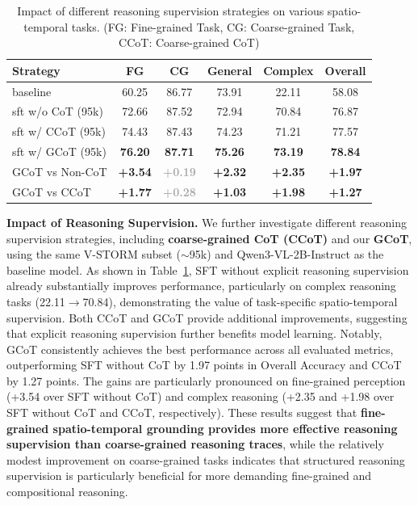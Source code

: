 \documentclass[letterpaper]{article} %
\begin{document}
\begin{table}[t]
\centering
\small
\caption{Impact of different reasoning supervision strategies on various spatio-temporal tasks. (FG: Fine-grained Task, CG: Coarse-grained Task, CCoT: Coarse-grained CoT)}
\setlength{\tabcolsep}{1mm}
\begin{tabular}{lccccc}
\toprule
\textbf{Strategy} 
& \textbf{FG} 
& \textbf{CG} 
& \textbf{General} 
& \textbf{Complex} 
& \textbf{Overall} \\
\midrule
baseline 
& 60.25 & 86.77 & 73.91 & 22.11 & 58.08 \\

sft w/o CoT (95k) 
& 72.66 & 87.52 & 72.94 & 70.84 & 76.87\\

sft w/ CCoT (95k) 
& 74.43 & 87.43 & 74.23 & 71.21 & 77.57 \\

sft w/ GCoT (95k) 
& \textbf{76.20} & \textbf{87.71} & \textbf{75.26} & \textbf{73.19} & \textbf{78.84} \\
\midrule

GCoT vs Non-CoT 
& \textbf{\textcolor{green!70!black}{+3.54}}
& \textbf{\textcolor{darkgray}{+0.19}}
& \textbf{\textcolor{green!70!black}{+2.32}}
& \textbf{\textcolor{green!70!black}{+2.35}}
& \textbf{\textcolor{green!70!black}{+1.97}}  \\

GCoT vs CCoT 
& \textbf{\textcolor{green!70!black}{+1.77}} 
& \textbf{\textcolor{darkgray}{+0.28}}
& \textbf{\textcolor{green!70!black}{+1.03}} 
& \textbf{\textcolor{green!70!black}{+1.98}}
& \textbf{\textcolor{green!70!black}{+1.27}} \\

\bottomrule
\end{tabular}
\label{tab:ablation}
\end{table}

\noindent\textbf{Impact of Reasoning Supervision.}
We further investigate different reasoning supervision strategies, including \textbf{coarse-grained CoT (CCoT)} and our \textbf{GCoT}, using the same V-STORM subset ($\sim$95k) and Qwen3-VL-2B-Instruct as the baseline model. As shown in Table~\ref{tab:ablation}, SFT without explicit reasoning supervision already substantially improves performance, particularly on complex reasoning tasks (22.11$\rightarrow$70.84), demonstrating the value of task-specific spatio-temporal supervision. Both CCoT and GCoT provide additional improvements, suggesting that explicit reasoning supervision further benefits model learning. Notably, GCoT consistently achieves the best performance across all evaluated metrics, outperforming SFT without CoT by 1.97 points in Overall Accuracy and CCoT by 1.27 points. The gains are particularly pronounced on fine-grained perception (+3.54 over SFT without CoT) and complex reasoning (+2.35 and +1.98 over SFT without CoT and CCoT, respectively). These results suggest that \textbf{fine-grained spatio-temporal grounding provides more effective reasoning supervision than coarse-grained reasoning traces}, while the relatively modest improvement on coarse-grained tasks indicates that structured reasoning supervision is particularly beneficial for more demanding fine-grained and compositional reasoning.
\end{document}
